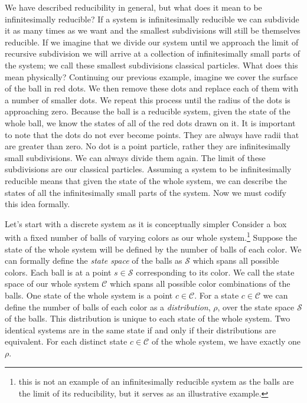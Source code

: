 \documentclass{article}
\begin{document}
	 We have described reducibility in general, but what does it mean to be infinitesimally reducible? If a system is infinitesimally reducible we can subdivide it as many times as we want and the smallest subdivisions will still be themselves reducible. If we imagine that we divide our system until we approach the limit of recursive subdivision we will arrive at a collection of infinitesimally small parts of the system; we call these smallest subdivisions classical particles. What does this mean physically? Continuing our previous example, imagine we cover the surface of the ball in red dots. We then remove these dots and replace each of them with a number of smaller dots. We repeat this process until the radius of the dots is approaching zero. Because the ball is a reducible system, given the state of the whole ball, we know the states of all of the red dots drawn on it. It is important to note that the dots do not ever become points. They are always have radii that are greater than zero. No dot is a point particle, rather they are infinitesimally small subdivisions. We can always divide them again. The limit of these subdivisions are our classical particles. Assuming a system to be infinitesimally reducible means that given the state of the whole system, we can describe the states of all the infinitesimally small parts of the system. Now we must codify this idea formally.
	 
	
	Let's start with a discrete system as it is conceptually simpler Consider a box with a fixed number of balls of varying colors as our whole system.\footnote{this is not an example of an infinitesimally reducible system as the balls are the limit of its reducibility, but it serves as an illustrative example.} Suppose the state of the whole system will be defined by the number of balls of each color. We can formally define the \textit{state space} of the balls as $\mathcal{S}$ which spans all possible colors. Each ball is at a point $s \in \mathcal{S}$ corresponding to its color. We call the state space of our whole system $\mathcal{C}$ which spans all possible color combinations of the balls. One state of the whole system is a point $c \in \mathcal{C}$. For a state $c \in \mathcal{C}$ we can define the number of balls of each color as a \textit{distribution}, $\rho$, over the state space $\mathcal{S}$ of the balls. This distribution is unique to each state of the whole system. Two identical systems are in the same state if and only if their distributions are equivalent. For each distinct state $c \in \mathcal{C}$ of the whole system, we have exactly one $\rho$. 
\end{document}

